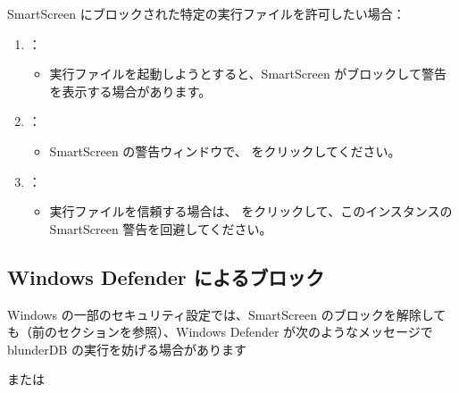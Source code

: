 \documentclass[letterpaper,10pt,dvipdfmx]{sphinxmanual}
\begin{document}
\sphinxAtStartPar
SmartScreen にブロックされた特定の実行ファイルを許可したい場合：
\begin{enumerate}
%
\item {} 
\sphinxAtStartPar
{}：
\begin{itemize}
\item {} 
\sphinxAtStartPar
実行ファイルを起動しようとすると、SmartScreen がブロックして警告を表示する場合があります。

\end{itemize}

\item {} 
\sphinxAtStartPar
{}：
\begin{itemize}
\item {} 
\sphinxAtStartPar
SmartScreen の警告ウィンドウで、 をクリックしてください。

\end{itemize}

\item {} 
\sphinxAtStartPar
{}：
\begin{itemize}
\item {} 
\sphinxAtStartPar
実行ファイルを信頼する場合は、 をクリックして、このインスタンスの SmartScreen 警告を回避してください。

\end{itemize}

\end{enumerate}


\subsection{Windows Defender によるブロック}
\label{\detokenize{annexe_windows_securite:blocage-windows-defender}}
\sphinxAtStartPar
Windows の一部のセキュリティ設定では、SmartScreen のブロックを解除しても（前のセクションを参照）、Windows Defender が次のようなメッセージで blunderDB の実行を妨げる場合があります

\begin{figure}[htbp]
\centering

\noindent{}
\end{figure}

\sphinxAtStartPar
または

\begin{figure}[htbp]
\centering

\noindent{}
\end{figure}
\end{document}
